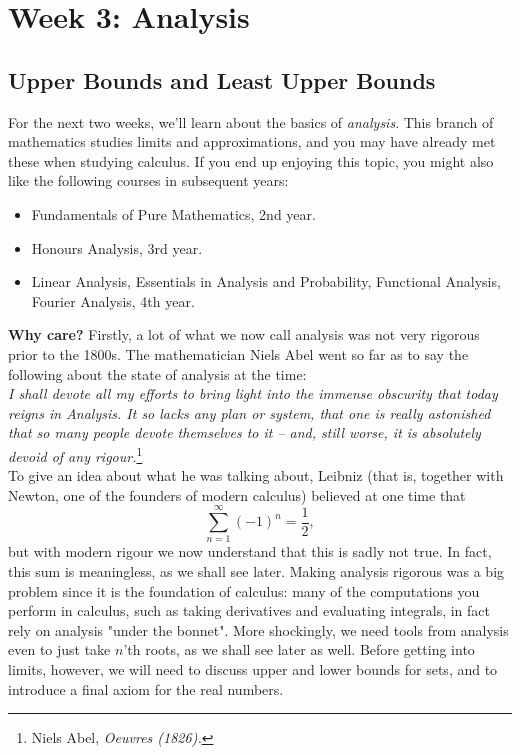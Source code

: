 \documentclass[11pt,dvipsnames]{book}
\numberwithin{figure}{section} %
\numberwithin{table}{section} %
\begin{document}

\part{Week 3: Analysis}


\chapter{Upper Bounds and Least Upper Bounds}

For the next two weeks, we'll learn about the basics of {\it analysis}. This branch of mathematics studies limits and approximations, and you may have already met these when studying calculus. If you end up enjoying this topic, you might also like the following courses in subsequent years:

\begin{itemize}
\item Fundamentals of Pure Mathematics, 2nd year.
\item Honours Analysis, 3rd year.
\item Linear Analysis, Essentials in Analysis and Probability, Functional Analysis, Fourier Analysis, 4th year.
\end{itemize}

\medskip
{\bf Why care?} Firstly, a lot of what we now call analysis was not very rigorous prior to the 1800s. The mathematician Niels Abel went so far as to say the following about the state of analysis at the time:\\

{\it  I shall devote all my efforts to bring light into the immense obscurity that today reigns in Analysis. It so lacks any plan or system, that one is really astonished that so many people devote themselves to it -- and, still worse, it is absolutely devoid of any rigour.}\footnote{Niels Abel, {\it Oeuvres (1826).}}\\

To give an idea about what he was talking about, Leibniz (that is, together with Newton, one of the founders of modern calculus) believed at one time that
\[
\sum_{n=1}^{\infty} (-1)^{n} = \frac{1}{2},
\]
but with modern rigour we now understand that this is sadly not true. In fact, this sum is meaningless, as we shall see later. Making analysis rigorous was a big problem since it is the foundation of calculus:  many of the computations you perform in calculus, such as taking derivatives and evaluating integrals, in fact rely on analysis "under the bonnet". More shockingly, we need tools from analysis even to just take $n$'th roots, as we shall see later as well. Before getting into limits, however, we will need to discuss upper and lower bounds for sets, and to introduce a final axiom for the real numbers.
\end{document}
